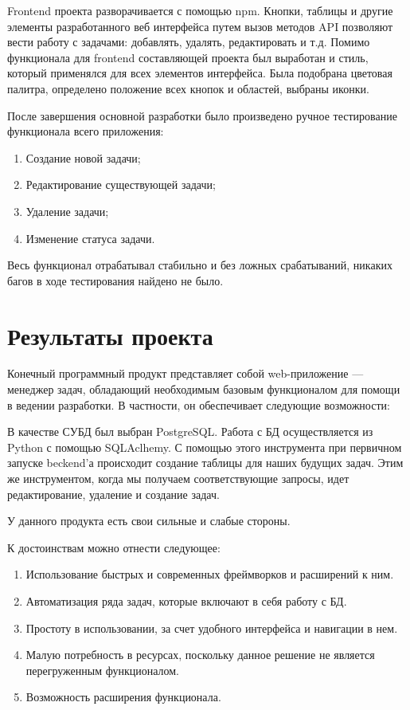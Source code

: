\documentclass{altsu-report}
\begin{document}
Frontend проекта разворачивается с помощью npm. Кнопки, таблицы и другие элементы разработанного веб интерфейса путем вызов методов API позволяют вести работу с задачами: добавлять, удалять, редактировать и т.д. Помимо функционала для frontend составляющей проекта был выработан и стиль, который применялся для всех элементов интерфейса. Была подобрана цветовая палитра, определено положение всех кнопок и областей, выбраны иконки. 

После завершения основной разработки было произведено ручное тестирование функционала всего приложения:

\begin{enumerate}
    \item Создание новой задачи;
    \item Редактирование существующей задачи;
    \item Удаление задачи;
    \item Изменение статуса задачи.
\end{enumerate}

Весь функционал отрабатывал стабильно и без ложных срабатываний, никаких багов в ходе тестирования найдено не было.

\chapter{Результаты проекта}

Конечный программный продукт представляет собой web-приложение --- менеджер задач, обладающий необходимым базовым функционалом для помощи в ведении разработки. В частности, он обеспечивает следующие возможности:

В качестве СУБД был выбран PostgreSQL. Работа с БД осуществляется из Python с помощью SQLAclhemy. С помощью этого инструмента при первичном запуске beckend'а происходит создание таблицы для наших будущих задач. Этим же инструментом, когда мы получаем соответствующие запросы, идет редактирование, удаление и создание задач.

У данного продукта есть свои сильные и слабые стороны.

К достоинствам можно отнести следующее:

\begin{enumerate}
    \item Использование быстрых и современных фреймворков и расширений к ним.
    \item Автоматизация ряда задач, которые включают в себя работу с БД.
    \item Простоту в использовании, за счет удобного интерфейса и навигации в нем.
    \item Малую потребность в ресурсах, поскольку данное решение не является перегруженным функционалом.
    \item Возможность расширения функционала.
\end{enumerate}
\end{document}
